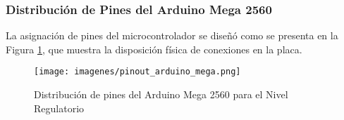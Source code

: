 \subsubsection{Distribución de Pines del Arduino Mega 2560}

La asignación de pines del microcontrolador se diseñó como se presenta en la Figura \ref{fig:pinout_arduino_mega}, que muestra la disposición física de conexiones en la placa.

\begin{figure}[H]
    \centering
    \texttt{[image: imagenes/pinout\_arduino\_mega.png]}
    \caption{Distribución de pines del Arduino Mega 2560 para el Nivel Regulatorio}
    \label{fig:pinout_arduino_mega}
\end{figure}
